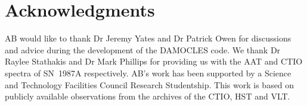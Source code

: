 \documentclass[useAMS,usenatbib,usegraphicx]{mnras}
\begin{document}
%
%
%
%
%
%
%
\section*{Acknowledgments}

AB would like to thank Dr Jeremy Yates and Dr Patrick Owen for discussions and advice during 
the development of the DAMOCLES code.  We thank Dr Raylee Stathakis and Dr Mark Phillips for 
providing us with the AAT and CTIO spectra of SN~1987A respectively.  AB's work has been 
supported by a Science and Technology Facilities Council Research 
Studentship.  This work is based on publicly available observations from the archives of the CTIO, HST and VLT.

{}

\end{document}
